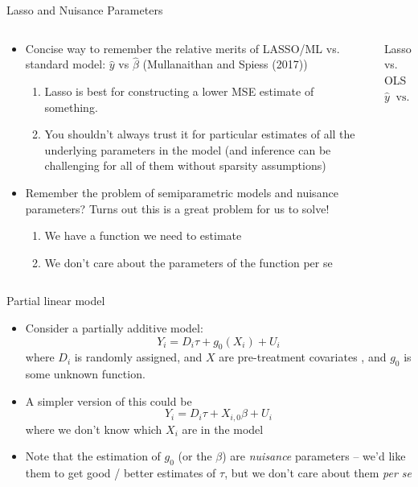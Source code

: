  \begin{frame}{Lasso and Nuisance Parameters}
      \begin{columns}[T] %
      \begin{column}{.8\textwidth}
    \begin{itemize}
    \item Concise way to remember the relative merits of LASSO/ML
      vs. standard model: $\hat{y}$ vs $\hat{\beta}$ (Mullanaithan and
      Spiess (2017))
      \begin{enumerate}[-]
      \item Lasso is best for constructing a lower MSE estimate of
        something.
      \item You shouldn't always trust it for particular estimates of
        all the underlying parameters in the model (and inference can be 
        challenging for all of them without sparsity assumptions)
      \end{enumerate}
    \item Remember the problem of semiparametric models and nuisance
      parameters? Turns out this is a great problem for us to solve!
      \begin{enumerate}[-]
      \item We have a function we need to estimate
      \item We don't care about the parameters of the function per se
      \end{enumerate}
    \end{itemize}
  \end{column}
  \begin{column}{.3\textwidth}
    \begin{center}
      Lasso     vs.    OLS
  $$\hat{y} \;\; \text{vs.} \;\; \hat{\beta}$$
      \end{center}
    \end{column}
  \end{columns}
  
  \end{frame}
  
  \begin{frame}{Partial linear model}
    \begin{itemize}
    \item Consider a partially additive model:
      $$Y_{i} = D_{i}\tau + g_{0}(X_{i}) + U_{i}$$
      where $D_{i}$ is randomly assigned, and $X$ are pre-treatment covariates , and $g_{0}$ is some unknown function.
    \item A simpler version of this could be
      $$Y_{i} = D_{i}\tau + X_{i,0}\beta + U_{i}$$
      where we don't know which $X_{i}$ are in the model
    \item Note that the estimation of $g_{0}$ (or the $\beta$) are
      \emph{nuisance} parameters -- we'd like them to get good / better
      estimates of $\tau$, but we don't care about them \emph{per se}
    \end{itemize}
  \end{frame}
  
